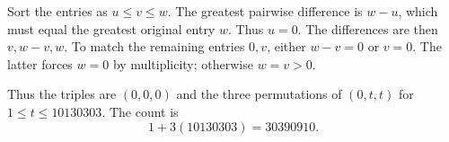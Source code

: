 Sort the entries as $u\le v\le w$. The greatest pairwise difference is $w-u$, which must equal the greatest original entry $w$. Thus $u=0$. The differences are then $v,w-v,w$. To match the remaining entries $0,v$, either $w-v=0$ or $v=0$. The latter forces $w=0$ by multiplicity; otherwise $w=v>0$.

Thus the triples are $(0,0,0)$ and the three permutations of $(0,t,t)$ for $1\le t\le10130303$. The count is
\[
\boxed{1+3(10130303)=30390910}.
\]
